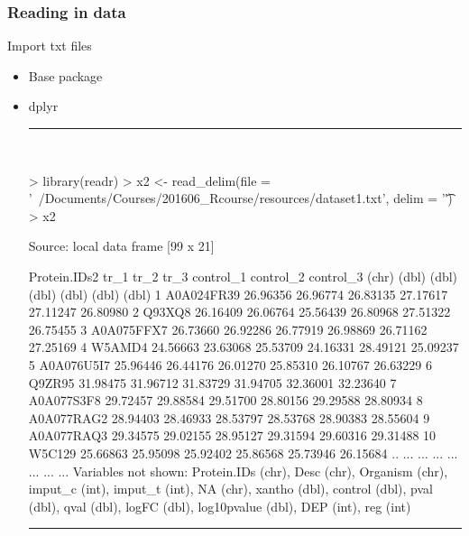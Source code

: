 \documentclass{beamer}
\begin{document}
\begin{frame}[fragile]
	\frametitle{Reading in data}
	\centering \Large Import txt files
	\begin{itemize}
		\small
		\item Base package
		\item dplyr
\rule{\textwidth}{0.4pt}\\
\tiny
\setlength{\fancyvrbtopsep}{-1pt}
\setlength{\fancyvrbpartopsep}{-1pt}
\begin{Schunk}
\begin{Sinput}
> library(readr)
> x2 <- read_delim(file = '~/Documents/Courses/201606_Rcourse/resources/dataset1.txt', delim = '\t')
> x2
\end{Sinput}
\begin{Soutput}
Source: local data frame [99 x 21]

   Protein.IDs2     tr_1     tr_2     tr_3 control_1 control_2 control_3
          (chr)    (dbl)    (dbl)    (dbl)     (dbl)     (dbl)     (dbl)
1    A0A024FR39 26.96356 26.96774 26.83135  27.17617  27.11247  26.80980
2        Q93XQ8 26.16409 26.06764 25.56439  26.80968  27.51322  26.75455
3    A0A075FFX7 26.73660 26.92286 26.77919  26.98869  26.71162  27.25169
4        W5AMD4 24.56663 23.63068 25.53709  24.16331  28.49121  25.09237
5    A0A076U5I7 25.96446 26.44176 26.01270  25.85310  26.10767  26.63229
6        Q9ZR95 31.98475 31.96712 31.83729  31.94705  32.36001  32.23640
7    A0A077S3F8 29.72457 29.88584 29.51700  28.80156  29.29588  28.80934
8    A0A077RAG2 28.94403 28.46933 28.53797  28.53768  28.90383  28.55604
9    A0A077RAQ3 29.34575 29.02155 28.95127  29.31594  29.60316  29.31488
10       W5C129 25.66863 25.95098 25.92402  25.86568  25.73946  26.15684
..          ...      ...      ...      ...       ...       ...       ...
Variables not shown: Protein.IDs (chr), Desc (chr), Organism (chr), imput_c
  (int), imput_t (int), NA (chr), xantho (dbl), control (dbl), pval (dbl), qval
  (dbl), logFC (dbl), log10pvalue (dbl), DEP (int), reg (int)
\end{Soutput}
\end{Schunk}
\rule{\textwidth}{0.4pt}\\
\small
	
	\end{itemize}
\end{frame}
\end{document}
